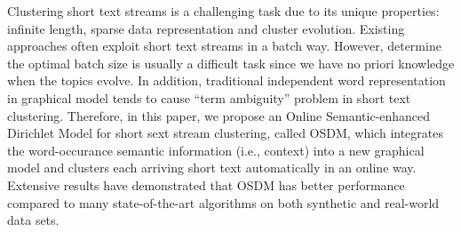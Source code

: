 Clustering short text streams is a challenging task due to its unique properties: infinite length, sparse data representation and cluster evolution. Existing approaches often exploit short text streams in a batch way. However, determine the optimal batch size is usually a difficult task since we have no priori knowledge  when the topics evolve. In addition, traditional independent word representation in graphical model  tends to cause ``term ambiguity'' problem in short text clustering. Therefore, in this paper, we propose an Online Semantic-enhanced Dirichlet Model for short sext stream clustering, called OSDM, which integrates the word-occurance semantic information (i.e., context) into a new graphical model and clusters each arriving short text automatically in an online way. Extensive results have demonstrated that OSDM has better performance compared to many state-of-the-art algorithms on both synthetic and real-world data sets.
